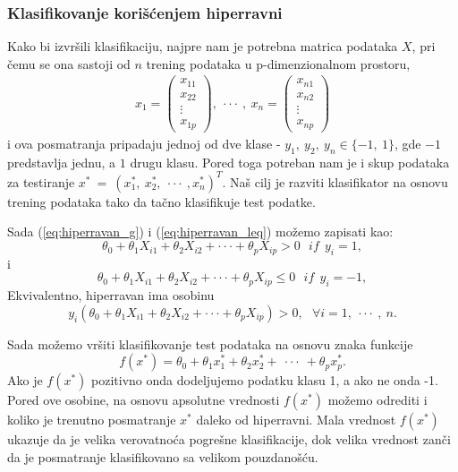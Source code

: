 \subsubsection{Klasifikovanje korišćenjem hiperravni}
Kako bi izvršili klasifikaciju, najpre nam je potrebna matrica podataka $X$, pri
čemu se ona sastoji od $n$ trening podataka u p-dimenzionalnom prostoru,
\begin{align}
    x_1 = \begin{pmatrix} x_{11} \\ x_{22} \\ \vdots \\ x_{1p} \end{pmatrix}, \ \cdot\cdot\cdot \ , \ x_n = \begin{pmatrix} x_{n1} \\ x_{n2} \\ \vdots \\ x_{np} \end{pmatrix}
\end{align}
i ova posmatranja pripadaju jednoj od dve klase - $y_1, \ y_2, \ y_n \in \{-1, \ 1\}$,
gde $-1$ predstavlja jednu, a $1$ drugu klasu. Pored toga potreban nam je i
skup podataka za testiranje $x^* \ = \ \left(x^{*}_{1}, \ x^{*}_{2}, \ \cdot\cdot\cdot \ , x^{*}_{n}\right)^T$. Naš cilj je razviti klasifikator
na osnovu trening podataka tako da tačno klasifikuje test podatke.

Sada (\ref{eq:hiperravan_g}) i (\ref{eq:hiperravan_leq}) možemo zapisati kao:
\begin{equation} \label{eq:hiperravan_g_if}
  \theta_0 + \theta_1X_{i1} + \theta_2X_{i2} + \cdot\cdot\cdot + \theta_pX_{ip} > 0 \ \ \ if \ \ y_i = 1,
\end{equation}
i
\begin{equation} \label{eq:hiperravan_leq_if}
  \theta_0 + \theta_1X_{i1} + \theta_2X_{i2} + \cdot\cdot\cdot + \theta_pX_{ip} \leq 0 \ \ \ if \ \ y_i = -1,
\end{equation}
Ekvivalentno, hiperravan ima osobinu
\begin{equation} \label{eq:hiperravan_property}
  y_i\left(\theta_0 + \theta_1X_{i1} + \theta_2X_{i2} + \cdot\cdot\cdot + \theta_pX_{ip}\right) > 0, \ \ \ \forall i = 1, \ \cdot\cdot\cdot \ , \ n.
\end{equation}

Sada možemo vršiti klasifikovanje test podataka na osnovu znaka funkcije
$$f\left(x^*\right) = \theta_0 + \theta_1x^{*}_{1} + \theta_2x^{*}_{2} + \ \cdot\cdot\cdot \ + \theta_px^{*}_{p}.$$
Ako je $f\left(x^*\right)$ pozitivno onda dodeljujemo podatku klasu 1, a ako ne onda -1.
Pored ove osobine, na osnovu apsolutne vrednosti $f\left(x^*\right)$ možemo odrediti i koliko je
trenutno posmatranje $x^*$ daleko od hiperravni. Mala vrednost $f\left(x^*\right)$ ukazuje da je velika
verovatnoća pogrešne klasifikacije, dok velika vrednost zanči da je posmatranje klasifikovano
sa velikom pouzdanošću.

